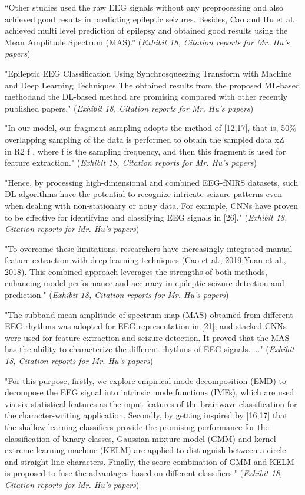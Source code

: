\documentclass{article}
\begin{document}
“Other studies  used the raw EEG signals without any preprocessing and also achieved good results in predicting epileptic seizures. Besides, Cao and Hu et al. achieved multi level prediction of epilepsy and obtained good results using the Mean Amplitude Spectrum (MAS).” ({\it Exhibit 18, Citation reports for Mr. Hu’s papers})

"Epileptic EEG Classification Using Synchrosqueezing Transform with Machine and Deep Learning Techniques
The obtained results from the proposed ML-based methodand the DL-based method are promising compared with other recently published papers."  ({\it Exhibit 18, Citation reports for Mr. Hu’s papers})

"In our model, our fragment sampling adopts the method of [12,17], that is, 50\% overlapping sampling of the data is performed to obtain the sampled data xZ \\in R2 f , where f is the sampling frequency, and then this fragment is used for feature extraction." ({\it Exhibit 18, Citation reports for Mr. Hu’s papers})

"Hence, by processing high-dimensional and combined EEG-fNIRS datasets, such DL algorithms have the potential to recognize intricate seizure patterns even when dealing with non-stationary or noisy data. For example, CNNs have proven to be effective for identifying and classifying EEG signals in [26]." ({\it Exhibit 18, Citation reports for Mr. Hu’s papers})

"To overcome these limitations, researchers have increasingly integrated manual feature extraction with deep learning techniques (Cao et al., 2019;Yuan et al., 2018). This combined approach leverages the strengths of both methods, enhancing model performance and accuracy in epileptic seizure detection and prediction." ({\it Exhibit 18, Citation reports for Mr. Hu’s papers})

"The subband mean amplitude of spectrum map (MAS) obtained from different EEG rhythms was adopted for EEG representation in [21], and stacked CNNs were used for feature extraction and seizure detection. It proved that the MAS has the ability to characterize the different rhythms of EEG signals. ..." ({\it Exhibit 18, Citation reports for Mr. Hu’s papers})

"For this purpose, firstly, we explore empirical mode decomposition (EMD) to decompose the EEG signal into intrinsic mode functions (IMFs), which are used via six statistical features as the input features of the brainwave classification for the character-writing application. Secondly, by getting inspired by [16,17] that the shallow learning classifiers provide the promising performance for the classification of binary classes, Gaussian mixture model (GMM) and kernel extreme learning machine (KELM) are applied to distinguish between a circle and straight line characters. Finally, the score combination of GMM and KELM is proposed to fuse the advantages based on different classifiers." ({\it Exhibit 18, Citation reports for Mr. Hu’s papers})
\end{document}
